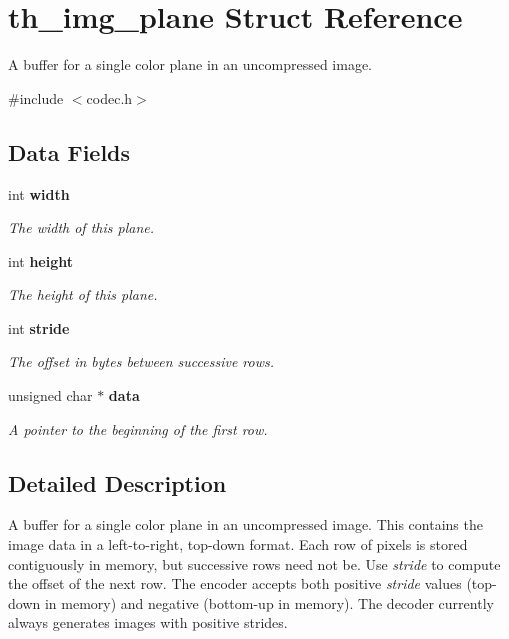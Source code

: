 \section{th\_\-img\_\-plane Struct Reference}
\label{structth__img__plane}


A buffer for a single color plane in an uncompressed image.  


{\ttfamily \#include $<$codec.h$>$}\subsection*{Data Fields}
\begin{DoxyCompactItemize}
\item 
int {\bf width}
\begin{DoxyCompactList}\small\item\em The width of this plane. \item\end{DoxyCompactList}\item 
int {\bf height}
\begin{DoxyCompactList}\small\item\em The height of this plane. \item\end{DoxyCompactList}\item 
int {\bf stride}
\begin{DoxyCompactList}\small\item\em The offset in bytes between successive rows. \item\end{DoxyCompactList}\item 
unsigned char $\ast$ {\bf data}
\begin{DoxyCompactList}\small\item\em A pointer to the beginning of the first row. \item\end{DoxyCompactList}\end{DoxyCompactItemize}


\subsection{Detailed Description}
A buffer for a single color plane in an uncompressed image. This contains the image data in a left-\/to-\/right, top-\/down format. Each row of pixels is stored contiguously in memory, but successive rows need not be. Use {\itshape stride\/} to compute the offset of the next row. The encoder accepts both positive {\itshape stride\/} values (top-\/down in memory) and negative (bottom-\/up in memory). The decoder currently always generates images with positive strides. 

